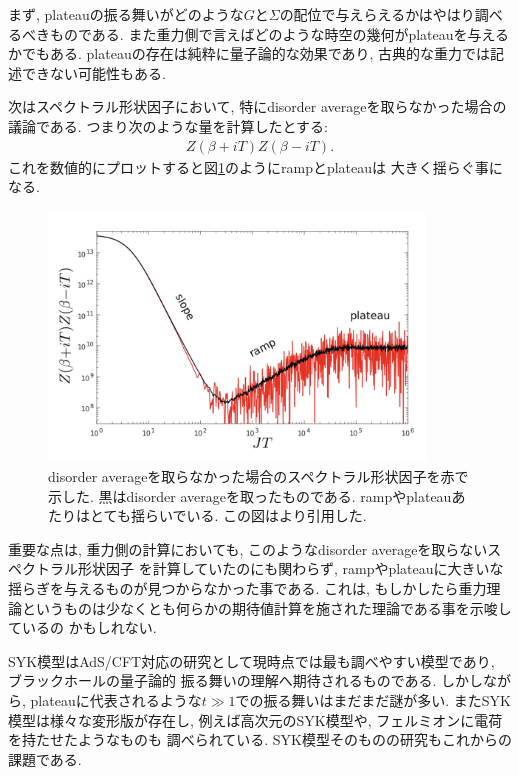 まず, plateauの振る舞いがどのような$G$と$\Sigma$の配位で与えらえるかはやはり調べるべきものである. 
また重力側で言えばどのような時空の幾何がplateauを与えるかでもある. 
plateauの存在は純粋に量子論的な効果であり, 古典的な重力では記述できない可能性もある. 

次はスペクトラル形状因子において, 特にdisorder averageを取らなかった場合の議論である. 
つまり次のような量を計算したとする:
\begin{align}
	Z(\beta + iT)Z(\beta - iT).
\end{align}
これを数値的にプロットすると図\ref{fig:non_disorder_averaged_g}のようにrampとplateauは
大きく揺らぐ事になる. 
\begin{figure}[ht]
	\centering
	\includegraphics[width=10cm]{figures/non_disorder_averaged_g}
	\caption{disorder averageを取らなかった場合のスペクトラル形状因子を赤で示した. 
	黒はdisorder averageを取ったものである. 
	rampやplateauあたりはとても揺らいでいる. この図は\cite{stanford_chaos}より引用した. }
	\label{fig:non_disorder_averaged_g}
\end{figure}

重要な点は, 重力側の計算においても, このようなdisorder averageを取らないスペクトラル形状因子
を計算していたのにも関わらず, rampやplateauに大きいな揺らぎを与えるものが見つからなかった事である. 
これは, もしかしたら重力理論というものは少なくとも何らかの期待値計算を施された理論である事を示唆しているの
かもしれない\cite{stanford_chaos}. 

SYK模型はAdS/CFT対応の研究として現時点では最も調べやすい模型であり, ブラックホールの量子論的
振る舞いの理解へ期待されるものである. 
しかしながら, plateauに代表されるような$t \gg 1$での振る舞いはまだまだ謎が多い. 
またSYK模型は様々な変形版が存在し, 例えば高次元のSYK模型や, フェルミオンに電荷を持たせたようなものも
調べられている\cite{gaikwad}\cite{berkooz}. 
SYK模型そのものの研究もこれからの課題である. 

\pagebreak
